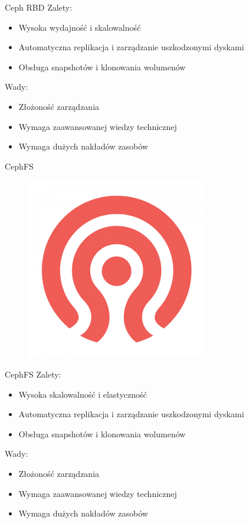 \documentclass[polish,envcountsect,10pt]{beamer}
\begin{document}
\begin{frame}{Ceph RBD}
	Zalety:
	\begin{itemize}
		\item Wysoka wydajność i skalowalność 
		\item Automatyczna replikacja i zarządzanie uszkodzonymi dyskami 
		\item Obsługa snapshotów i klonowania wolumenów 
	\end{itemize}
	\medskip
	Wady:
	\begin{itemize}
		\item Złożoność zarządzania 
		\item Wymaga zaawansowanej wiedzy technicznej 
		\item Wymaga dużych nakładów zasobów 
	\end{itemize}
\end{frame}

\begin{frame}{CephFS}
	\begin{figure}[H]
    	\includegraphics[width=0.4\linewidth]{images/ceph.png}
	\end{figure}
\end{frame}

\begin{frame}{CephFS}
	Zalety:
	\begin{itemize}
		\item Wysoka skalowalność i elastyczność 
		\item Automatyczna replikacja i zarządzanie uszkodzonymi dyskami 
		\item Obsługa snapshotów i klonowania wolumenów 
	\end{itemize}
	\medskip
	Wady:
	\begin{itemize}
		\item Złożoność zarządzania 
		\item Wymaga zaawansowanej wiedzy technicznej 
		\item Wymaga dużych nakładów zasobów 
	\end{itemize}
\end{frame}
\end{document}
